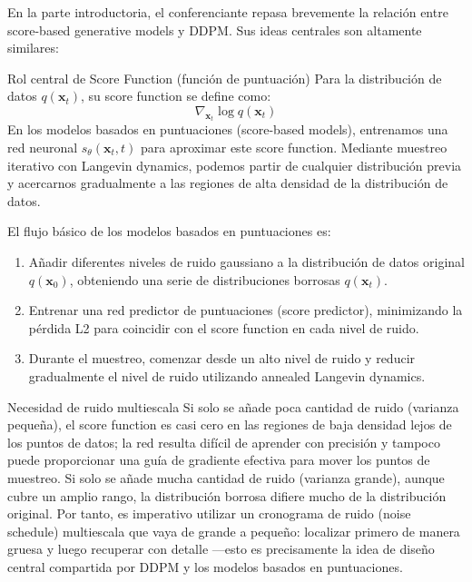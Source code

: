 \documentclass[a4paper]{article}
\begin{document}
En la parte introductoria, el conferenciante repasa brevemente la relación entre score-based generative models y DDPM. Sus ideas centrales son altamente similares:

\begin{knowledgebox}{Rol central de Score Function (función de puntuación)}
Para la distribución de datos $q(\mathbf{x}_t)$, su score function se define como:
$$
\nabla_{\mathbf{x}_t} \log q(\mathbf{x}_t)
$$
En los modelos basados en puntuaciones (score-based models), entrenamos una red neuronal $s_\theta(\mathbf{x}_t, t)$ para aproximar este score function. Mediante muestreo iterativo con Langevin dynamics, podemos partir de cualquier distribución previa y acercarnos gradualmente a las regiones de alta densidad de la distribución de datos.
\end{knowledgebox}

El flujo básico de los modelos basados en puntuaciones es:
\begin{enumerate}
    \item Añadir diferentes niveles de ruido gaussiano a la distribución de datos original $q(\mathbf{x}_0)$, obteniendo una serie de distribuciones borrosas $q(\mathbf{x}_t)$.
    \item Entrenar una red predictor de puntuaciones (score predictor), minimizando la pérdida L2 para coincidir con el score function en cada nivel de ruido.
    \item Durante el muestreo, comenzar desde un alto nivel de ruido y reducir gradualmente el nivel de ruido utilizando annealed Langevin dynamics.
\end{enumerate}

\begin{warningbox}{Necesidad de ruido multiescala}
Si solo se añade poca cantidad de ruido (varianza pequeña), el score function es casi cero en las regiones de baja densidad lejos de los puntos de datos; la red resulta difícil de aprender con precisión y tampoco puede proporcionar una guía de gradiente efectiva para mover los puntos de muestreo. Si solo se añade mucha cantidad de ruido (varianza grande), aunque cubre un amplio rango, la distribución borrosa difiere mucho de la distribución original. Por tanto, es imperativo utilizar un cronograma de ruido (noise schedule) multiescala que vaya de grande a pequeño: localizar primero de manera gruesa y luego recuperar con detalle —esto es precisamente la idea de diseño central compartida por DDPM y los modelos basados en puntuaciones.
\end{warningbox}
\end{document}

